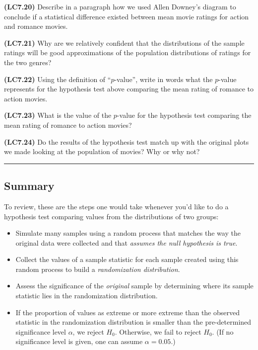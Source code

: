 \documentclass[]{tufte-book}
\let\oldrule=\rule
\renewcommand{\rule}[1]{\oldrule{\linewidth}}
\begin{document}
\textbf{(LC7.20)} Describe in a paragraph how we used Allen Downey's
diagram to conclude if a statistical difference existed between mean
movie ratings for action and romance movies.

\textbf{(LC7.21)} Why are we relatively confident that the distributions
of the sample ratings will be good approximations of the population
distributions of ratings for the two genres?

\textbf{(LC7.22)} Using the definition of ``\(p\)-value'', write in
words what the \(p\)-value represents for the hypothesis test above
comparing the mean rating of romance to action movies.

\textbf{(LC7.23)} What is the value of the \(p\)-value for the
hypothesis test comparing the mean rating of romance to action movies?

\textbf{(LC7.24)} Do the results of the hypothesis test match up with
the original plots we made looking at the population of movies? Why or
why not?

\begin{center}\rule{0.5\linewidth}{\linethickness}\end{center}

\subsection{Summary}\label{summary-5}

To review, these are the steps one would take whenever you'd like to do
a hypothesis test comparing values from the distributions of two groups:

\begin{itemize}
\item
  Simulate many samples using a random process that matches the way the
  original data were collected and that \emph{assumes the null
  hypothesis is true}.
\item
  Collect the values of a sample statistic for each sample created using
  this random process to build a \emph{randomization distribution}.
\item
  Assess the significance of the \emph{original} sample by determining
  where its sample statistic lies in the randomization distribution.
\item
  If the proportion of values as extreme or more extreme than the
  observed statistic in the randomization distribution is smaller than
  the pre-determined significance level \(\alpha\), we reject \(H_0\).
  Otherwise, we fail to reject \(H_0\). (If no significance level is
  given, one can assume \(\alpha = 0.05\).)
\end{itemize}
\end{document}
